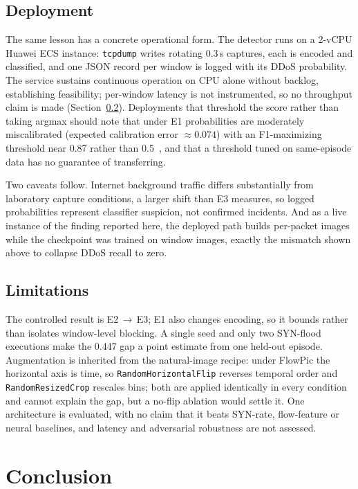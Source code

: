 \documentclass[conference]{IEEEtran} \IEEEoverridecommandlockouts
\begin{document}
\subsection{Deployment} The same lesson has a concrete operational form. The detector runs on a 2-vCPU
Huawei ECS instance: \texttt{tcpdump} writes rotating 0.3\,s captures, each is
encoded and classified, and one JSON record per window is logged with its DDoS
probability. The service sustains continuous operation on CPU alone without backlog,
establishing feasibility; per-window latency is not instrumented, so no
throughput claim is made (Section~\ref{sec:limits}). Deployments that threshold
the score rather than taking argmax should note that under E1 probabilities are
moderately miscalibrated (expected calibration error $\approx 0.074$) with an
F1-maximizing threshold near 0.87 rather than 0.5~\cite{guo2017calibration},
and that a threshold tuned on same-episode data has no guarantee of
transferring.

Two caveats follow. Internet background traffic differs substantially from
laboratory capture conditions, a larger shift than E3 measures, so logged
probabilities represent classifier suspicion, not confirmed incidents. And as a
live instance of the finding reported here, the deployed path builds per-packet
images while the checkpoint was trained on window images, exactly the mismatch
shown above to collapse DDoS recall to zero.

\subsection{Limitations} \label{sec:limits}

The controlled result is E2\,$\to$\,E3; E1 also changes encoding, so it bounds
rather than isolates window-level blocking. A single seed and only two
SYN-flood executions make the 0.447 gap a point estimate from one held-out
episode. Augmentation is inherited from the natural-image recipe: under FlowPic
the horizontal axis is time, so \texttt{RandomHorizontalFlip} reverses temporal
order and \texttt{RandomResizedCrop} rescales bins; both are applied identically
in every condition and cannot explain the gap, but a no-flip ablation would
settle it. One architecture is evaluated, with no claim that it beats SYN-rate,
flow-feature or neural baselines, and latency and adversarial robustness are
not assessed.

\section{Conclusion}
\label{sec:conclusion}
\end{document}
